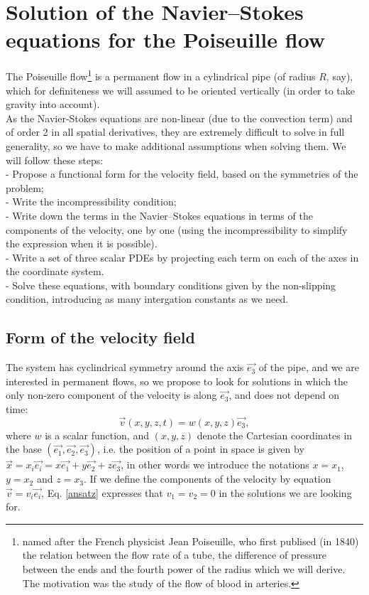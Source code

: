 \documentclass[DIV=12]{article}
\newcommand{\eBase}{(\vec{e_1}, \vec{e_2},\vec{e_3})}
\begin{document}
\section{Solution of the Navier--Stokes equations for the Poiseuille flow}

The Poiseuille flow\footnote{named after the French physicist Jean Poiseuille, who first publised (in 1840) the relation 
 between the flow rate of a tube, the difference of pressure between the ends and the fourth power of the radius 
 which we will derive. The motivation was the study of the flow of blood in arteries.} is a permanent flow in a cylindrical pipe (of radius $R$, say),
which for definiteness we will assumed to be oriented vertically (in order to take gravity 
into account).\\

 As the Navier-Stokes equations are non-linear (due to the
convection term) and of order 2 in all spatial derivatives, they are extremely 
difficult to solve in full generality, so we have to make 
 additional assumptions when solving them. We will follow these steps:\\
- Propose a functional form for the velocity field, based on the symmetries of the 
 problem;\\
- Write the incompressibility condition;\\
- Write down the terms in the Navier--Stokes equations in terms of the 
 components of the velocity, one by one (using the incompressibility to simplify the expression when it is 
 possible).\\
- Write a set of three scalar PDEs by projecting each term on each of the axes 
 in the coordinate system.\\
- Solve these equations, with  boundary conditions given by the non-slipping condition, introducing as many
 intergation constants as we need.

\subsection{Form of the velocity field}
 The system has cyclindrical symmetry around the axis $\vec{e_3}$ of the 
 pipe, and we are interested in permanent flows, so we propose to look for 
 solutions in which the only non-zero component of the velocity is along $\vec{e_3}$, and does not depend on time:\\
\begin{equation}
 \boxed{
 \vec{v}( x,y,z,t ) = w( x,y,z) \vec{e_3},}
 \label{ansatz}
\end{equation}
 where $w$ is a scalar function, and $(x,y,z)$ denote the Cartesian coordinates 
 in the base $\eBase$, i.e. the position of a point in space is given by $\vec{x} = x_i \vec{e_i} = x\vec{e_1} + y \vec{e_2} + z \vec{e_3}$,
 in other words we introduce the notations $x=x_1$, $y=x_2$ and $z = x_3$.
 If we define the components of the velocity by equation $\vec{v} = v_i \vec{e_i}$, Eq.  \ref{ansatz}
 expresses that $v_1 = v_2 = 0$ in the solutions we are looking for. 
\end{document}
